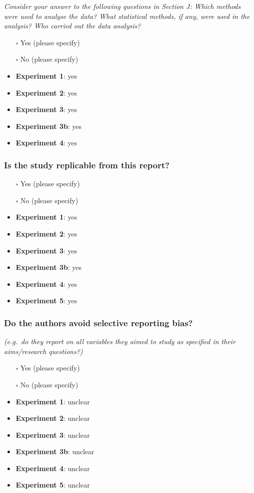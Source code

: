 \documentclass[
  doc, a4paper]{apa7}
\begin{document}
\emph{Consider your answer to the following questions in Section J: Which methods were used to analyse the data? What statistical methods, if any, were used in the analysis? Who carried out the data analysis?}

\begin{itemize}
\item[$\square$]
  Yes (please specify)
\item[$\square$]
  No (please specify)
\item
  \textbf{Experiment 1}: yes
\item
  \textbf{Experiment 2}: yes
\item
  \textbf{Experiment 3}: yes
\item
  \textbf{Experiment 3b}: yes
\item
  \textbf{Experiment 4}: yes
\end{itemize}

\subsubsection{Is the study replicable from this report?}\label{is-the-study-replicable-from-this-report}

\begin{itemize}
\item[$\square$]
  Yes (please specify)
\item[$\square$]
  No (please specify)
\item
  \textbf{Experiment 1}: yes
\item
  \textbf{Experiment 2}: yes
\item
  \textbf{Experiment 3}: yes
\item
  \textbf{Experiment 3b}: yes
\item
  \textbf{Experiment 4}: yes
\item
  \textbf{Experiment 5}: yes
\end{itemize}

\subsubsection{Do the authors avoid selective reporting bias?}\label{do-the-authors-avoid-selective-reporting-bias}

\emph{(e.g.~do they report on all variables they aimed to study as specified in their aims/research questions?)}

\begin{itemize}
\item[$\square$]
  Yes (please specify)
\item[$\square$]
  No (please specify)
\item
  \textbf{Experiment 1}: unclear
\item
  \textbf{Experiment 2}: unclear
\item
  \textbf{Experiment 3}: unclear
\item
  \textbf{Experiment 3b}: unclear
\item
  \textbf{Experiment 4}: unclear
\item
  \textbf{Experiment 5}: unclear
\end{itemize}
\end{document}
